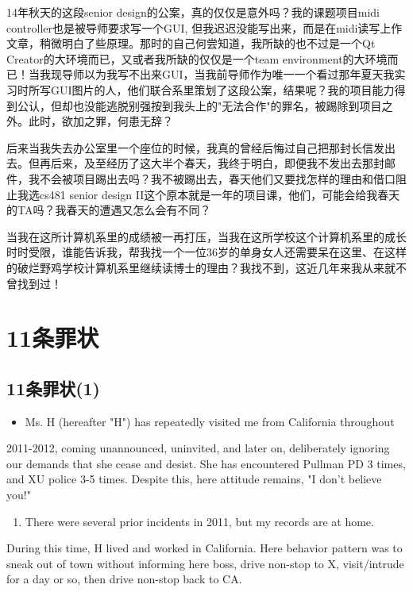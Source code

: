 \documentclass[12pt]{book}
\begin{document}
14年秋天的这段senior design的公案，真的仅仅是意外吗？我的课题项目midi controller也是被导师要求写一个GUI, 但我迟迟没能写出来，而是在midi读写上作文章，稍微明白了些原理。那时的自己何尝知道，我所缺的也不过是一个Qt Creator的大环境而已，又或者我所缺的仅仅是一个team environment的大环境而已！当我现导师以为我写不出来GUI，当我前导师作为唯一一个看过那年夏天我实习时所写GUI图片的人，他们联合系里策划了这段公案，结果呢？我的项目能力得到公认，但却也没能逃脱别强按到我头上的"无法合作"的罪名，被踢除到项目之外。此时，欲加之罪，何患无辞？

后来当我失去办公室里一个座位的时候，我真的曾经后悔过自己把那封长信发出去。但再后来，及至经历了这大半个春天，我终于明白，即便我不发出去那封邮件，我不会被项目踢出去吗？我不被踢出去，春天他们又要找怎样的理由和借口阻止我选cs481 senior design II这个原本就是一年的项目课，他们，可能会给我春天的TA吗？我春天的遭遇又怎么会有不同？

当我在这所计算机系里的成绩被一再打压，当我在这所学校这个计算机系里的成长时时受限，谁能告诉我，帮我找一个一位36岁的单身女人还需要呆在这里、在这样的破烂野鸡学校计算机系里继续读博士的理由？我找不到，这近几年来我从来就不曾找到过！

\chapter{11条罪状}
\label{sec-43}
\section{11条罪状(1)}
\label{sec-43-1}

\begin{itemize}
\item Ms. H (hereafter "H") has repeatedly visited me from California throughout
\end{itemize}
2011-2012, coming unannounced, uninvited, and later on, deliberately 
ignoring our demands that she cease and desist. She has encountered Pullman 
PD 3 times, and XU police 3-5 times. Despite this, here attitude remains, "I
don't believe you!"  

\begin{enumerate}
\item There were several prior incidents in 2011, but my records are at home.
\end{enumerate}
During this time, H lived and worked in California. Here behavior pattern 
was to sneak out of town without informing here boss, drive non-stop to X, 
visit/intrude for a day or so, then drive non-stop back to CA.
\end{document}

